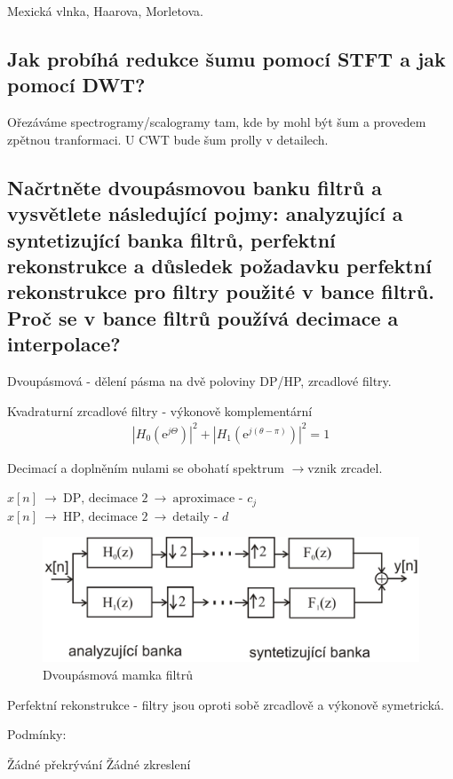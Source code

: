 \documentclass[a4paper,12pt]{article}   %
\newcommand{\rrarr}{$\rightarrow$}
\newcommand{\ejt}{\text{e}^{j\Theta}}
\newcommand{\e}{\text{e}}
\begin{document}
Mexická vlnka, Haarova, Morletova.


\subsection{Jak probíhá redukce šumu pomocí STFT a jak pomocí DWT?}

Ořezáváme spectrogramy/scalogramy tam, kde by mohl být šum a provedem zpětnou tranformaci. U CWT bude šum prolly v detailech. 


\subsection{Načrtněte dvoupásmovou banku filtrů a vysvětlete následující pojmy: analyzující a syntetizující banka filtrů, perfektní rekonstrukce a důsledek požadavku perfektní rekonstrukce pro filtry použité v bance filtrů. Proč se v bance filtrů používá decimace a interpolace?}
Dvoupásmová - dělení pásma na dvě poloviny DP/HP, zrcadlové filtry. 

Kvadraturní zrcadlové filtry - výkonově komplementární \
\begin{align*}
        |H_0(\ejt)|^2 + |H_1(\e^{j(\theta-\pi)})|^2 = 1
\end{align*}

Decimací a doplněním nulami se obohatí spektrum \rrarr vznik zrcadel.


$x[n]~\rightarrow~\text{DP, decimace 2}~\rightarrow~\text{aproximace - }c_j$\\
$x[n]~\rightarrow~\text{HP, decimace 2}~\rightarrow~\text{detaily - }d$

\begin{figure}[h!]
        \centering
        \includegraphics[width=.7\textwidth]{fig/banka_filtru.png}
        \caption*{Dvoupásmová mamka filtrů}
\end{figure}

Perfektní rekonstrukce - filtry jsou oproti sobě zrcadlově a výkonově symetrická.

Podmínky:
\begin{outline}
        \1 Žádné překrývání
        \1 Žádné zkreslení
\end{outline}
\end{document}
